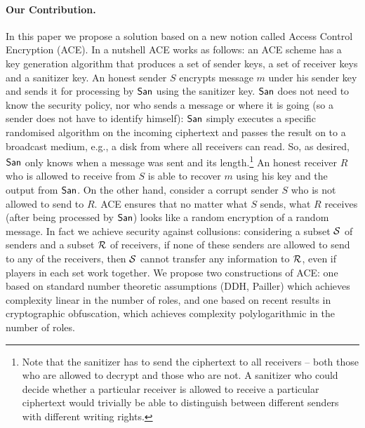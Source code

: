 \documentclass{llncs}
\begin{document}
\paragraph{Our Contribution.} In this paper we propose a solution based on
a new notion called Access Control Encryption (ACE).
In a nutshell ACE works as follows:  an ACE scheme has a key generation algorithm that produces a set of sender keys, a set of receiver keys and a sanitizer key. 
An honest  sender $S$  encrypts  message $m$ under his sender key and sends it for processing by $\mathsf{San}$ using the sanitizer key. $\mathsf{San}$ does not need to know the security policy, nor who sends a message or where it is going (so a sender does not have to identify himself): $\mathsf{San}$ simply executes a specific randomised algorithm on the incoming ciphertext and passes the result on to a broadcast medium, e.g., a disk from where all receivers can read. So, as desired, 
$\mathsf{San}$ only knows when a message was sent and its length.\footnote{Note that the sanitizer has to send the ciphertext to all receivers -- both those who are allowed to decrypt and those who are not. A sanitizer who could decide whether a particular receiver is allowed to receive a particular ciphertext would trivially be able to distinguish between different senders with different writing rights.} An honest receiver $R$ who is allowed to receive from $S$ is able to recover $m$ 
using his key and the output from $\mathsf{San}$. On the other hand, consider a corrupt sender $S$ who is not allowed to send to $R$. ACE ensures that no matter what $S$ sends, what $R$ receives (after being processed by $\mathsf{San}$) looks like a random encryption of a random message.
 In fact we achieve security against collusions: considering a subset $\cal S$ of senders and a subset $\cal R$ of receivers, if none of these senders are allowed to send to any of the receivers, then $\cal S$ cannot transfer any information to 
$\cal R$, even if players in each set work together. We propose two constructions of ACE: one based on standard number theoretic assumptions (DDH, Pailler) which achieves complexity linear in the number of roles,  and one based on recent results in cryptographic obfuscation, which achieves complexity polylogarithmic in the number of roles.
\end{document}

